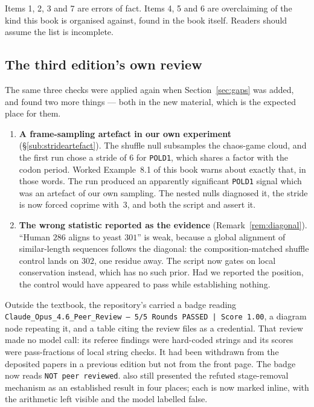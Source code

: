 Items 1, 2, 3 and 7 are errors of fact. Items 4, 5 and 6 are overclaiming of the
kind this book is organised against, found in the book itself. Readers should
assume the list is incomplete.

\subsection*{The third edition's own review}

The same three checks were applied again when Section~\ref{sec:gaps} was added,
and found two more things --- both in the new material, which is the expected
place for them.

\begin{enumerate}[leftmargin=*,itemsep=3pt]
  \item \textbf{A frame-sampling artefact in our own experiment}
        (\S\ref{sub:strideartefact}). The shuffle null subsamples the chaos-game
        cloud, and the first run chose a stride of $6$ for \texttt{POLD1}, which
        shares a factor with the codon period. Worked Example~8.1 of this book
        warns about exactly that, in those words. The run produced an apparently
        significant \texttt{POLD1} signal which was an artefact of our own
        sampling. The nested nulls diagnosed it, the stride is now forced
        coprime with~$3$, and both the script and
         assert it.
  \item \textbf{The wrong statistic reported as the evidence}
        (Remark~\ref{rem:diagonal}). ``Human $286$ aligns to yeast $301$'' is
        weak, because a global alignment of similar-length sequences follows the
        diagonal: the composition-matched shuffle control lands on $302$, one
        residue away. The script now gates on local conservation instead, which
        has no such prior. Had we reported the position, the control would have
        appeared to pass while establishing nothing.
\end{enumerate}

Outside the textbook, the repository's  carried a badge reading
\texttt{Claude\_Opus\_4.6\_Peer\_Review — 5/5 Rounds PASSED | Score 1.00}, a
diagram node repeating it, and a table citing the review files as a credential.
That review made no model call: its referee findings were hard-coded strings and
its scores were pass-fractions of local string checks. It had been withdrawn
from the deposited papers in a previous edition but not from the front page. The
badge now reads \texttt{NOT peer reviewed}.
 also still presented the refuted
stage-removal mechanism as an established result in four places; each is now
marked inline, with the arithmetic left visible and the model labelled false.

